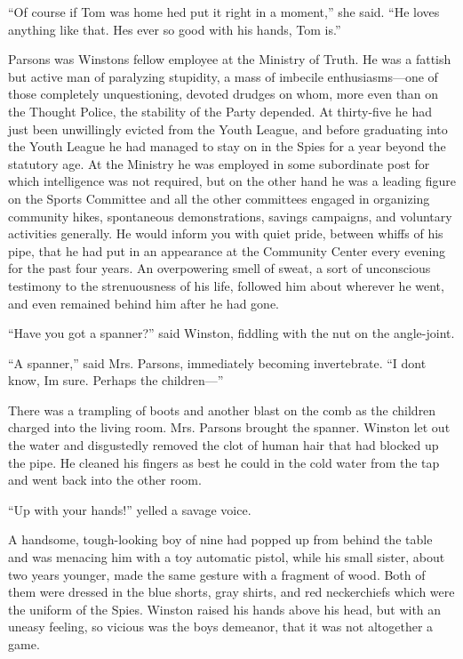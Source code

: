 ``Of course if Tom was home he\textquotesingle d put it right in a
moment,'' she said. ``He loves anything like that. He\textquotesingle s
ever so good with his hands, Tom is.''

Parsons was Winston\textquotesingle s fellow employee at the Ministry of
Truth. He was a fattish but active man of paralyzing stupidity, a mass
of imbecile enthusiasms---one of those completely unquestioning, devoted
drudges on whom, more even than on the Thought Police, the stability of
the Party depended. At thirty-five he had just been unwillingly evicted
from the Youth League, and before graduating into the Youth League he
had managed to stay on in the Spies for a year beyond the statutory age.
At the Ministry he was employed in some subordinate post for which
intelligence was not required, but on the other hand he was a leading
figure on the Sports Committee and all the other committees engaged in
organizing community hikes, spontaneous demonstrations, savings
campaigns, and voluntary activities generally. He would inform you with
quiet pride, between whiffs of his pipe, that he had put in an
appearance at the Community Center every evening for the past four
years. An overpowering smell of sweat, a sort of unconscious testimony
to the strenuousness of his life, followed him about wherever he went,
and even remained behind him after he had gone.

``Have you got a spanner?'' said Winston, fiddling with the nut on the
angle-joint.

``A spanner,'' said Mrs. Parsons, immediately becoming invertebrate. ``I
don\textquotesingle t know, I\textquotesingle m sure. Perhaps the
children---''

There was a trampling of boots and another blast on the comb as the
children charged into the living room. Mrs. Parsons brought the spanner.
Winston let out the water and disgustedly removed the clot of human hair
that had blocked up the pipe. He cleaned his fingers as best he could in
the cold water from the tap and went back into the other room.

``Up with your hands!'' yelled a savage voice.

A handsome, tough-looking boy of nine had popped up from behind the
table and was menacing him with a toy automatic pistol, while his small
sister, about two years younger, made the same gesture with a fragment
of wood. Both of them were dressed in the blue shorts, gray shirts, and
red neckerchiefs which were the uniform of the Spies. Winston raised his
hands above his head, but with an uneasy feeling, so vicious was the
boy\textquotesingle s demeanor, that it was not altogether a game.

